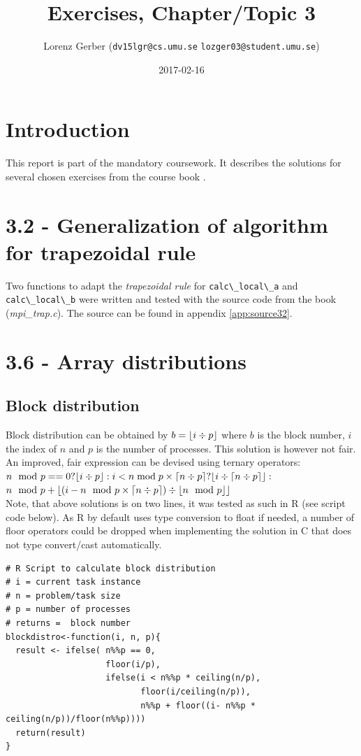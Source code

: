 \documentclass[a4paper,11pt,twoside]{article}
\title{Exercises, Chapter/Topic 3}
\author{Lorenz Gerber ({\tt{dv15lgr@cs.umu.se}} {\tt{lozger03@student.umu.se}})}
\date{2017-02-16}
\DeclarePairedDelimiter{\ceil}{\lceil}{\rceil}
\DeclarePairedDelimiter{\floor}{\lfloor}{\rfloor}
\begin{document}
\lstset{language=C}
\maketitle
\thispagestyle{empty}
\newpage
\tableofcontents
\thispagestyle{empty}
\newpage

\clearpage
{}

\section{Introduction}
This report is part of the mandatory coursework. It describes the solutions for several chosen exercises from the course book \cite{pacheco2011}.

\section{3.2 - Generalization of algorithm for trapezoidal rule}
Two functions to adapt the \textit{trapezoidal rule} for \verb+calc\_local\_a+ and \verb+calc\_local\_b+ were written and tested with the source code from the book (\textit{mpi\_trap.c}). The source can be found in appendix \ref{app:source32}.

\section{3.6 - Array distributions}

\subsection*{Block distribution}
Block distribution can be obtained by $b = \floor*{i \div p}$ where $b$ is the block number, $i$ the index of $n$ and $p$ is the number of processes. This solution is however not fair. An improved, fair expression can be devised using ternary operators:\\
$n\mod p==0?\floor*{i\div p}:i<n\bmod p\times\ceil*{n\div p}?\floor*{i\div\ceil*{n\div p}}:$\\
$n\mod p+\floor*{(i-n\mod p\times\ceil*{n\div p})\div\floor*{n\mod p}}$\\
Note, that above solutions is on two lines, it was tested as such in R (see script code below). As R by default uses type conversion to float if needed, a number of floor operators could be dropped when implementing the solution in C that does not type convert/cast automatically.
\begin{verbatim}
# R Script to calculate block distribution
# i = current task instance
# n = problem/task size
# p = number of processes
# returns =  block number
blockdistro<-function(i, n, p){
  result <- ifelse( n%%p == 0, 
                    floor(i/p), 
                    ifelse(i < n%%p * ceiling(n/p),
                           floor(i/ceiling(n/p)), 
                           n%%p + floor((i- n%%p * ceiling(n/p))/floor(n%%p))))
  return(result)
}
\end{verbatim}
\end{document}
